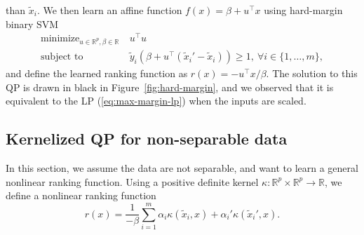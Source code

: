 \documentclass{article}
\newcommand{\RR}{\mathbb R}
\DeclareMathOperator*{\minimize}{minimize}
\begin{document}
than $\tilde x_i$. We then learn an affine function
$f(x)=\beta+u^\intercal x$ using hard-margin binary SVM
\begin{equation}
  \label{eq:max-margin-qp-tilde}
  \begin{aligned}
    \minimize_{u\in\RR^p, \beta\in\RR}\ & u^\intercal u  \\
    \text{subject to}\ & 
    \tilde y_i (\beta + u^\intercal( \tilde x_i'-\tilde x_i) ) \geq 1,
    \ \forall i\in\{1,\dots,m\},
  \end{aligned}
\end{equation}
and define the learned ranking function as $r(x) = -u^\intercal
x/\beta$. The solution to this QP is drawn in black in
Figure~\ref{fig:hard-margin}, and we observed that it is equivalent to
the LP (\ref{eq:max-margin-lp}) when the inputs are scaled.
\subsection{Kernelized QP for non-separable data}
\label{sec:kernelized-qp}
In this section, we assume the data are not separable, and want to
learn a general nonlinear ranking function. Using a positive
definite kernel $\kappa:\RR^p\times \RR^p\rightarrow\RR$,
%
we define a nonlinear ranking function
\begin{equation}
  \label{eq:kernelized_r}
  r(x)
= \frac{1}{-\beta}
  \sum_{i=1}^m
    \alpha_i \kappa(\tilde x_i, x) + \alpha_i'  \kappa(\tilde x_i', x).
\end{equation}
\end{document}
